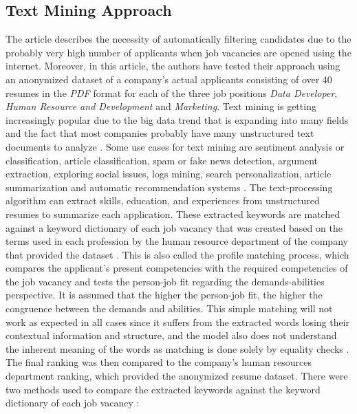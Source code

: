 \documentclass[draft,final]{thesisclass} %
\begin{document}
\subsection{Text Mining Approach} \label{text_mining_approach}
The article \textcite{text_mining_for_automatic_profiling} describes the necessity of automatically filtering candidates due to the probably very high number of applicants when job vacancies are opened using the internet.
Moreover, in this article, the authors have tested their approach using an anonymized dataset of a company's actual applicants consisting of over $40$ resumes in the \textit{PDF} format for each of the three job positions \textit{Data Developer}, \textit{Human Resource and Development} and \textit{Marketing}.
Text mining is getting increasingly popular due to the big data trend that is expanding into many fields and the fact that most companies probably have many unstructured text documents to analyze \parencite[49]{text_mining_for_automatic_profiling}.
Some use cases for text mining are sentiment analysis or classification, article classification, spam or fake news detection, argument extraction, exploring social issues, logs mining, search personalization, article summarization and automatic recommendation systems \parencite[49]{text_mining_for_automatic_profiling}.
The text-processing algorithm can extract skills, education, and experiences from unstructured resumes to summarize each application.
These extracted keywords are matched against a keyword dictionary of each job vacancy that was created based on the terms used in each profession by the human resource department of the company that provided the dataset \parencite[47]{text_mining_for_automatic_profiling}.
This is also called the profile matching process, which compares the applicant's present competencies with the required competencies of the job vacancy and tests the person-job fit regarding the demands-abilities perspective.
It is assumed that the higher the person-job fit, the higher the congruence between the demands and abilities.
This simple matching will not work as expected in all cases since it suffers from the extracted words losing their contextual information and structure, and the model also does not understand the inherent meaning of the words as matching is done solely by equality checks \parencite[517]{applicant_semantic_matching}.
The final ranking was then compared to the company's human resources department ranking, which provided the anonymized resume dataset.
There were two methods used to compare the extracted keywords against the keyword dictionary of each job vacancy \parencite[53-58]{text_mining_for_automatic_profiling}:
\end{document}
